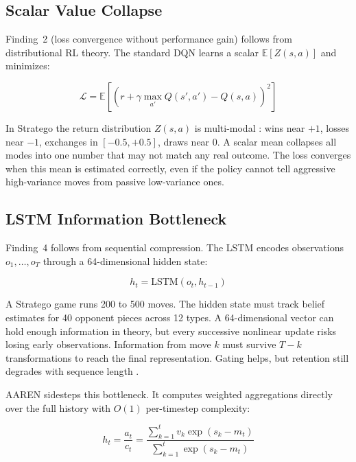 \subsection{Scalar Value Collapse}

Finding~2 (loss convergence without performance gain) follows from distributional RL theory. The standard DQN learns a scalar $\mathbb{E}[Z(s,a)]$ and minimizes:

\begin{equation}
\mathcal{L} = \mathbb{E}\left[\left(r + \gamma \max_{a'} Q(s', a') - Q(s, a)\right)^2\right]
\end{equation}

In Stratego the return distribution $Z(s,a)$ is multi-modal \cite{RainbowJMLR2021}: wins near $+1$, losses near $-1$, exchanges in $[-0.5, +0.5]$, draws near $0$. A scalar mean collapses all modes into one number that may not match any real outcome. The loss converges when this mean is estimated correctly, even if the policy cannot tell aggressive high-variance moves from passive low-variance ones.


\subsection{LSTM Information Bottleneck}

Finding~4 follows from sequential compression. The LSTM encodes observations $o_1, \ldots, o_T$ through a 64-dimensional hidden state:

\begin{equation}
h_t = \text{LSTM}(o_t, h_{t-1})
\end{equation}

A Stratego game runs 200 to 500 moves. The hidden state must track belief estimates for 40 opponent pieces across 12 types. A 64-dimensional vector can hold enough information in theory, but every successive nonlinear update risks losing early observations. Information from move $k$ must survive $T - k$ transformations to reach the final representation. Gating helps, but retention still degrades with sequence length \cite{Aaren}.

AAREN sidesteps this bottleneck. It computes weighted aggregations directly over the full history with $O(1)$ per-timestep complexity:

\begin{equation}
h_t = \frac{a_t}{c_t} = \frac{\sum_{k=1}^{t} v_k \exp(s_k - m_t)}{\sum_{k=1}^{t} \exp(s_k - m_t)}
\end{equation}

